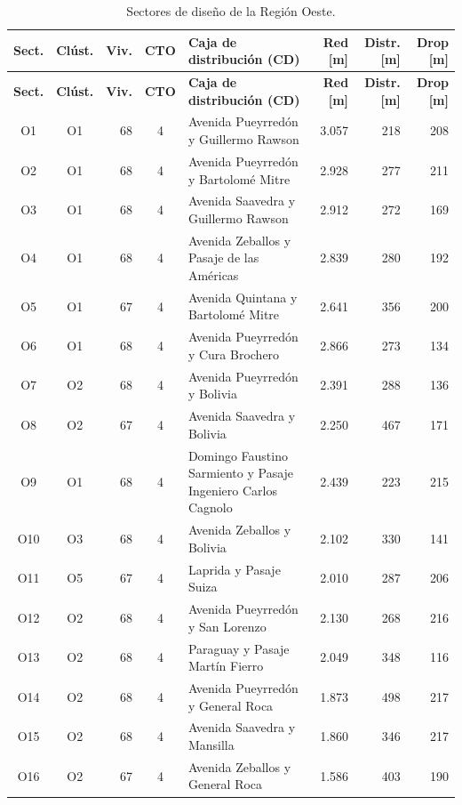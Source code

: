 \footnotesize\setlength{\tabcolsep}{4pt}\begin{longtable}{|c|c|r|c|p{4.2cm}|r|r|r|}
\caption{Sectores de diseño de la Región Oeste.}\label{tab:sectores_O}\\ \hline
\textbf{Sect.} & \textbf{Clúst.} & \textbf{Viv.} & \textbf{CTO} & \textbf{Caja de distribución (CD)} & \textbf{Red [m]} & \textbf{Distr. [m]} & \textbf{Drop [m]} \\ \hline \endfirsthead
\hline \textbf{Sect.} & \textbf{Clúst.} & \textbf{Viv.} & \textbf{CTO} & \textbf{Caja de distribución (CD)} & \textbf{Red [m]} & \textbf{Distr. [m]} & \textbf{Drop [m]} \\ \hline \endhead
O1 & O1 & 68 & 4 & Avenida Pueyrredón y Guillermo Rawson & 3.057 & 218 & 208 \\ \hline
O2 & O1 & 68 & 4 & Avenida Pueyrredón y Bartolomé Mitre & 2.928 & 277 & 211 \\ \hline
O3 & O1 & 68 & 4 & Avenida Saavedra y Guillermo Rawson & 2.912 & 272 & 169 \\ \hline
O4 & O1 & 68 & 4 & Avenida Zeballos y Pasaje de las Américas & 2.839 & 280 & 192 \\ \hline
O5 & O1 & 67 & 4 & Avenida Quintana y Bartolomé Mitre & 2.641 & 356 & 200 \\ \hline
O6 & O1 & 68 & 4 & Avenida Pueyrredón y Cura Brochero & 2.866 & 273 & 134 \\ \hline
O7 & O2 & 68 & 4 & Avenida Pueyrredón y Bolivia & 2.391 & 288 & 136 \\ \hline
O8 & O2 & 67 & 4 & Avenida Saavedra y Bolivia & 2.250 & 467 & 171 \\ \hline
O9 & O1 & 68 & 4 & Domingo Faustino Sarmiento y Pasaje Ingeniero Carlos Cagnolo & 2.439 & 223 & 215 \\ \hline
O10 & O3 & 68 & 4 & Avenida Zeballos y Bolivia & 2.102 & 330 & 141 \\ \hline
O11 & O5 & 67 & 4 & Laprida y Pasaje Suiza & 2.010 & 287 & 206 \\ \hline
O12 & O2 & 68 & 4 & Avenida Pueyrredón y San Lorenzo & 2.130 & 268 & 216 \\ \hline
O13 & O2 & 68 & 4 & Paraguay y Pasaje Martín Fierro & 2.049 & 348 & 116 \\ \hline
O14 & O2 & 68 & 4 & Avenida Pueyrredón y General Roca & 1.873 & 498 & 217 \\ \hline
O15 & O2 & 68 & 4 & Avenida Saavedra y Mansilla & 1.860 & 346 & 217 \\ \hline
O16 & O2 & 67 & 4 & Avenida Zeballos y General Roca & 1.586 & 403 & 190 \\ \hline

\end{longtable}
